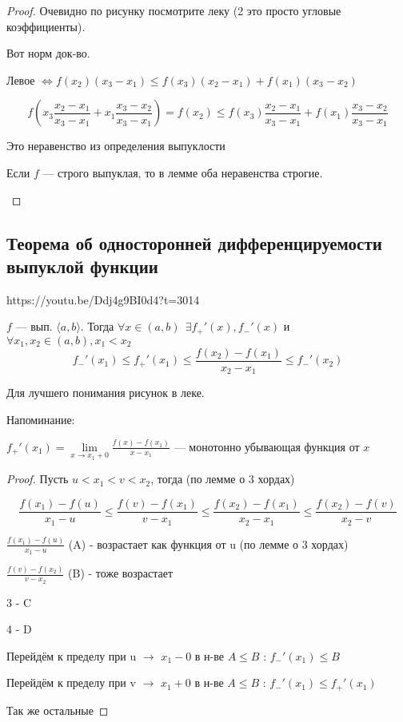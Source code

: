 \documentclass[../main.tex]{subfiles}
\begin{document}
\begin{proof}
    Очевидно по рисунку посмотрите леку (2 это просто угловые коэффициенты). 
    
    Вот норм док-во.
    
    Левое $\Leftrightarrow f(x_2)(x_3-x_1)\leq f(x_3)(x_2-x_1)+f(x_1)(x_3-x_2)$

    $$f\left(x_3\frac{x_2-x_1}{x_3-x_1}+x_1\frac{x_3-x_2}{x_3-x_1}\right)=f(x_2)\leq f(x_3)\frac{x_2-x_1}{x_3-x_1}+f(x_1)\frac{x_3-x_2}{x_3-x_1}$$
    
    Это неравенство из определения выпуклости 
    \begin{remark}
    Если $f$ --- строго выпуклая, то в лемме оба неравенства строгие.
    \end{remark}
\end{proof}
    
    
\newpage


\subsection{Теорема об односторонней дифференцируемости выпуклой функции}
https://youtu.be/Ddj4g9BI0d4?t=3014

\begin{theorem}
    $f$ --- вып. $\langle a,b\rangle$. Тогда $\forall x\in(a,b) \ \ \exists f_+'(x), f_-'(x)$ и $\forall x_1, x_2\in(a,b), x_1<x_2$
    $$f_-'(x_1)\leq f_+'(x_1)\leq \frac{f(x_2)-f(x_1)}{x_2-x_1}\leq f_-'(x_2)$$
\end{theorem}

    Для лучшего понимания рисунок в леке.

    Напоминание:

    $f_+'(x_1)=\lim\limits_{x\to x_1+0}\frac{f(x)-f(x_1)}{x-x_1}$ --- монотонно убывающая функция от $x$


\begin{proof} 
    Пусть $u < x_1 < v < x_2$, тогда (по лемме о 3 хордах)
    
    $$\frac{f(x_1)-f(u)}{x_1-u}\leq\frac{f(v)-f(x_1)}{v-x_1}\leq\frac{f(x_2)-f(x_1)}{x_2-x_1}\leq\frac{f(x_2)-f(v)}{x_2-v}$$
    
    $\frac{f(x_1)-f(u)}{x_1-u}$ (A) - возрастает как функция от u (по лемме о 3 хордах) 
    
    $\frac{f(v)-f(x_2)}{v-x_2}$ (B) - тоже возрастает 
    
    3 - C
    
    4 - D
    
    Перейдём к пределу при u $\rightarrow$ $x_1 - 0$ в н-ве $A \leq B$ : $f_-'(x_1)\leq B$
    
    Перейдём к пределу при v $\rightarrow$ $x_1 + 0$ в н-ве $A \leq B$ : $f_-'(x_1)\leq f_+'(x_1)$
    
    Так же остальные
    
\end{proof}
\end{document}
